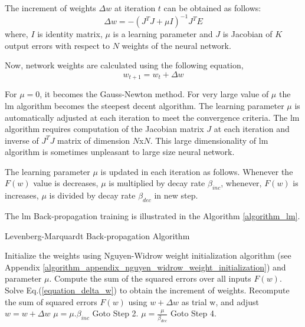 The increment of weights $\Delta{w}$ at iteration $t$ can be obtained as follows:
\begin{equation}\label{equation_delta_w}
\Delta{w}=-(J^TJ+\mu I)^{-1}J^TE
\end{equation}
where, $I$ is identity matrix, $\mu$ is a learning parameter and $J$ is Jacobian of $K$ output errors with respect to $N$ weights of the neural network.

Now, network weights are calculated using the following equation,
\begin{equation}\label{equation_new_weight}
w_{t+1}=w_t+\Delta{w}
\end{equation}


 For $\mu=0$, it becomes the Gauss-Newton method. For very large value of $\mu$ the \ac{lm} algorithm becomes the steepest decent algorithm. The learning parameter $\mu$  is automatically adjusted at each iteration to meet the convergence criteria. The \ac{lm} algorithm requires computation of the Jacobian matrix $J$ at each iteration and inverse of $J^TJ$ matrix of dimension $N$x$N$. This large dimensionality of \ac{lm} algorithm is sometimes unpleasant to large size neural network.

The learning parameter $\mu$ is updated in each iteration as follows. Whenever the $F(w)$ value is decreases, $\mu$ is multiplied by decay rate $\beta_{inc}$, whenever, $F(w)$ is increases, $\mu$ is divided by decay rate $\beta_{dec}$ in new step.

The \ac{lm} Back-propagation training is illustrated in the Algorithm \ref{algorithm_lm}.

\begin{algorithm}
\caption{Levenberg-Marquardt Back-propagation Algorithm}
\label{algorithm_lm}
\begin{algorithmic}[1]
\STATE Initialize the weights using Nguyen-Widrow weight initialization algorithm (see Appendix \ref{algorithm_appendix_nguyen_widrow_weight_initialization}) and parameter $\mu$.
\STATE Compute the sum of the squared errors over all inputs $F(w)$.
\STATE Solve Eq.(\ref{equation_delta_w}) to obtain the increment of weights.
\STATE Recompute the sum of squared errors $F(w)$ using $w+\Delta{w}$ as trial w, and adjust
\STATE $w=w+\Delta{w}$
\STATE $\mu=\mu.\beta_{inc}$
\STATE Goto Step 2.
\ELSE
\STATE $\mu=\frac{\mu}{\beta_{dec}}$
\STATE  Goto Step 4.
\ENDIF
\end{algorithmic}
\end{algorithm}
\pagebreak

